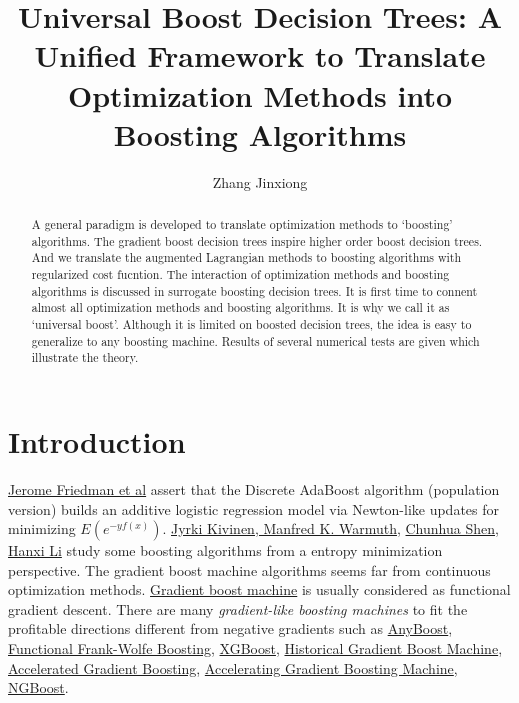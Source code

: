\documentclass[UTF8]{article}
\title{Universal Boost Decision Trees: A Unified Framework to Translate Optimization Methods into Boosting Algorithms}
\author{Zhang Jinxiong}
\begin{document}
\maketitle

\begin{abstract}

A  general paradigm is developed to translate  optimization methods to `boosting' algorithms. 
The gradient boost decision trees inspire  higher order boost decision trees.
And we translate the augmented Lagrangian methods to boosting algorithms with regularized cost fucntion.
The interaction of optimization methods and boosting algorithms is discussed in surrogate boosting decision trees.
It is first time to connent almost all optimization methods and boosting algorithms. 
It is why we call it as `universal boost'.
Although it is limited on boosted decision trees, the idea is easy to generalize to any boosting machine.
Results of several numerical tests are given which illustrate the theory.
\end{abstract}

\section{Introduction}
\href{https://web.stanford.edu/~hastie/Papers/AdditiveLogisticRegression/alr.pdf}{Jerome Friedman et al} assert that the Discrete AdaBoost algorithm (population version) builds
an additive logistic regression model via Newton-like updates for minimizing $E(e^{-yf(x)})$.
\href{https://users.soe.ucsc.edu/~manfred/pubs/C51.pdf}{Jyrki Kivinen, Manfred K. Warmuth},
\href{https://arxiv.org/pdf/0901.3590v1.pdf}{Chunhua Shen, Hanxi Li}
study some boosting algorithms from a entropy minimization perspective.
The gradient boost machine algorithms seems far from continuous optimization methods.
\href{http://docs.salford-systems.com/GreedyFuncApproxSS.pdf}{Gradient boost machine} is usually considered as functional gradient descent.
There are many \emph{gradient-like boosting machines} to fit the profitable directions different from negative gradients
such as 
\href{https://papers.nips.cc/paper/1766-boosting-algorithms-as-gradient-descent.pdf}{AnyBoost},
\href{https://arxiv.org/pdf/1510.02558.pdf}{Functional Frank-Wolfe Boosting},
\href{https://arxiv.org/abs/1603.02754}{XGBoost},
\href{https://easychair.org/publications/open/pCtK}{Historical Gradient Boost Machine},
\href{https://arxiv.org/abs/1803.02042}{Accelerated Gradient Boosting},
\href{https://arxiv.org/abs/1903.08708}{Accelerating Gradient Boosting Machine},
\href{https://arxiv.org/abs/1910.03225}{NGBoost}.
\end{document}
